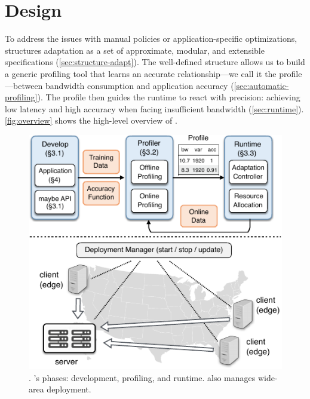 \section{\awstream{} Design}
\label{sec:system}

To address the issues with manual policies or application-specific
optimizations, \awstream{} structures adaptation as a set of approximate,
modular, and extensible specifications (\autoref{sec:structure-adapt}). The
well-defined structure allows us to build a generic profiling tool that learns
an accurate relationship---we call it the profile---between bandwidth
consumption and application accuracy (\autoref{sec:automatic-profiling}). The
profile then guides the runtime to react with precision: achieving low latency
and high accuracy when facing insufficient bandwidth
(\autoref{sec:runtime}). \autoref{fig:overview} shows the high-level overview of
\awstream{}.

\begin{figure}
  \centering
  \includegraphics[width=0.8\linewidth]{figures/system.pdf}
  \caption{. \awstream{}'s phases: development,
    profiling, and runtime. \awstream{} also manages wide-area deployment.}
  \label{fig:overview}
\end{figure}





